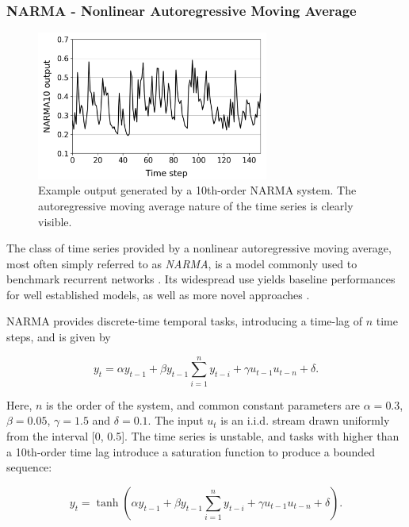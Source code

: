 \subsubsection{NARMA - Nonlinear Autoregressive Moving Average}

\begin{figure}[t!]
  \centering
  \includegraphics[width=3.0in]{figures/NARMA10.png}
  \caption{
    Example output generated by a 10th-order NARMA system. The autoregressive
moving average nature of the time series is clearly visible.
  }
  \label{fig:narma10}
\end{figure}

The class of time series provided by a nonlinear autoregressive moving average,
most often simply referred to as \textit{NARMA}, is a model commonly used to
benchmark recurrent networks \cite{atiya_new_2000}. Its widespread use yields
baseline performances for well established models, as well as more novel
approaches \cite{verstraeten_experimental_2007, appeltant_information_2011}.

NARMA provides discrete-time temporal tasks, introducing a time-lag of $n$ time
steps, and is given by

\begin{equation}
  y_{t} = \alpha y_{t-1} +
  \beta y_{t-1} \sum_{i=1}^{n}y_{t-i} +
  \gamma u_{t-1}u_{t-n} +
  \delta
  .
  \label{eq:narma}
\end{equation}

Here, $n$ is the order of the system, and common constant parameters are $\alpha
= 0.3$, $\beta = 0.05$, $\gamma = 1.5$ and $\delta = 0.1$. The input $u_{t}$ is
an i.i.d. stream drawn uniformly from the interval [0, 0.5]. The time series is
unstable, and tasks with higher than a 10th-order time lag introduce a
saturation function to produce a bounded sequence:

\begin{equation}
  y_{t} =
  \tanh(
  \alpha y_{t-1} +
  \beta y_{t-1} \sum_{i=1}^{n}y_{t-i} +
  \gamma u_{t-1}u_{t-n} +
  \delta
  )
  .
  \label{eq:narma-tanh}
\end{equation}

